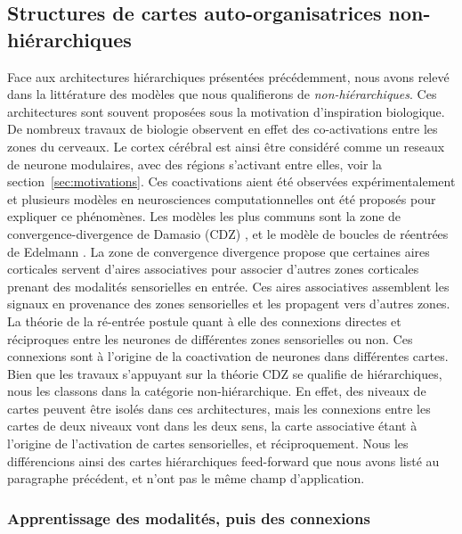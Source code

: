 \documentclass[../main]{subfiles}
\begin{document}
\subsection{Structures de cartes auto-organisatrices non-hiérarchiques}

Face aux architectures hiérarchiques présentées précédemment, nous avons relevé dans la littérature des modèles que nous qualifierons de \emph{non-hiérarchiques}.
Ces architectures sont souvent proposées sous la motivation d'inspiration biologique.
De nombreux travaux de biologie observent en effet des co-activations entre les zones du cerveaux. Le cortex cérébral est ainsi être considéré comme un reseaux de neurone modulaires, avec des régions s'activant entre elles, voir la section~\ref{sec:motivations}.
Ces coactivations aient été observées expérimentalement et plusieurs modèles en neurosciences computationnelles ont été proposés pour expliquer ce phénomènes. Les modèles les plus communs sont la zone de convergence-divergence de Damasio (CDZ) \cite{damasio_time-locked_1989}, et le modèle de boucles de réentrées de Edelmann \cite{Edelman1982GroupSA}.
La zone de convergence divergence propose que certaines aires corticales servent d'aires associatives pour associer d'autres zones corticales prenant des modalités sensorielles en entrée. Ces aires associatives assemblent les signaux en provenance des zones sensorielles et les propagent vers d'autres zones. 
La théorie de la ré-entrée postule quant à elle des connexions directes et réciproques entre les neurones de différentes zones sensorielles ou non. Ces connexions sont à l'origine de la coactivation de neurones dans différentes cartes.
Bien que les travaux s'appuyant sur la théorie CDZ se qualifie de hiérarchiques, nous les classons dans la catégorie non-hiérarchique. En effet, des niveaux de cartes peuvent être isolés dans ces architectures, mais les connexions entre les cartes de deux niveaux vont dans les deux sens, la carte associative étant à l'origine de l'activation de cartes sensorielles, et réciproquement. Nous les différencions ainsi des cartes hiérarchiques feed-forward que nous avons listé au paragraphe précédent, et n'ont pas le même champ d'application.

\subsubsection{Apprentissage des modalités, puis des connexions}
\end{document}
